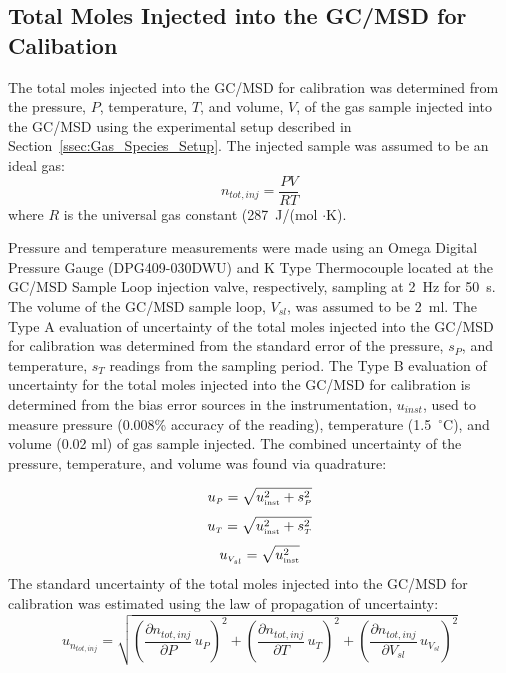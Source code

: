 \documentclass[12pt]{article}
\begin{document}
\subsection{Total Moles Injected into the GC/MSD for Calibation}
\label{ssec:Total Moles Injected into the GC/MSD for Calibation}

The total moles injected into the GC/MSD for calibration was determined from the pressure, $P$, temperature, $T$, and volume, $V$, of the gas sample injected into the GC/MSD using the experimental setup described in Section~\ref{ssec:Gas_Species_Setup}. The injected sample was assumed to be an ideal gas: 
\begin{equation}
\label{eq:molesinjected}
n_{tot, inj} = \frac{PV}{RT}
\end{equation}
where $R$ is the universal gas constant (287~J/(mol $\cdot$K).

Pressure and temperature measurements were made using an Omega Digital Pressure Gauge (DPG409-030DWU) and K Type Thermocouple located at the GC/MSD Sample Loop injection valve, respectively, sampling at 2~\si{Hz} for 50~\si{s}. The volume of the GC/MSD sample loop, $V_{sl}$, was assumed to be 2~\si{ml}. The Type A evaluation of uncertainty of the total moles injected into the GC/MSD for calibration was determined from the standard error of the pressure, $s_{P}$, and temperature, $s_{T}$ readings from the sampling period. The Type B evaluation of uncertainty for the total moles injected into the GC/MSD for calibration is determined from the bias error sources in the instrumentation, $u_{inst}$, used to measure pressure (0.008\% accuracy of the reading), temperature (1.5~$^\circ$C), and volume (0.02 ml) of gas sample injected. The combined uncertainty of the pressure, temperature, and volume was found via quadrature:

\begin{equation}
\label{eq:pressure_uncertainty}
u_{\scriptscriptstyle P} = \sqrt{ u_{\rm \scriptscriptstyle inst}^2 + s_{\scriptscriptstyle P}^2}
\end{equation}
\begin{equation}
\label{eq:temp_uncertainty}
u_{\scriptscriptstyle T} = \sqrt{ u_{\rm \scriptscriptstyle inst}^2 + s_{\scriptscriptstyle T}^2}
\end{equation}
\begin{equation}
\label{eq:volume_uncertainty}
u_{\scriptscriptstyle V_{sl}} =\sqrt{ u_{\rm \scriptscriptstyle inst}^2}
\end{equation}
The standard uncertainty of the total moles injected into the GC/MSD for calibration was estimated using the law of propagation of uncertainty:
\begin{equation}
\label{eq:moles_injected_uncertainty}
u_{\scriptscriptstyle n_{tot,inj}} = \sqrt{{\left( \frac{\partial n_{tot,inj}}{\partial P}\,u_{\scriptscriptstyle P} \right) }^2+{\left(\frac{\partial n_{tot,inj}}{\partial T}\,u_{\scriptscriptstyle T}\right)}^2+{\left(\frac{\partial n_{tot,inj}}{\partial V_{sl}}\,u_{\scriptscriptstyle V_{sl}}\right)}^2}
\end{equation}
\end{document}
